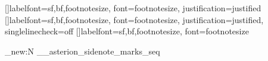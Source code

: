 \newlength{\overhang}
%
\newenvironment{fullwidth}
  {\setlength{\overhang}{\marginparwidth}%
   \addtolength{\overhang}{\marginparsep}%
   \ifthenelse{\boolean{@twoside}}%
     {\begin{adjustwidth*}{}{-\overhang}}%
     {\begin{adjustwidth}{}{-\overhang}}%
  }%
  {\ifthenelse{\boolean{@twoside}}%
    {\end{adjustwidth*}}%
    {\end{adjustwidth}}%
  }


\RequirePackage{fmtcount}
\RequirePackage{ragged2e} %
\newcommand{\marginparstyle}{\footnotesize} %
\long\def\@ympar#1{%
  \@savemarbox\@marbox{\marginparstyle#1}%
  \global\setbox\@currbox\copy\@marbox %
  \@xympar}
\renewcommand*{\marginfont}{\marginparstyle}

\newcommand\newthought[1]{%
   \addvspace{1.0\baselineskip plus 0.5ex minus 0.2ex}%
   \noindent\textsc{#1}%
}%
\ExplSyntaxOn
\NewDocumentCommand {}
{ 
  {
    {
    }
    {
    }
  }
  {
    {
    }
    {
    }
  }
}
\ExplSyntaxOff

\usepackage{caption}
[]{labelfont={sf,bf,footnotesize}, font=footnotesize, justification=justified}
[]{labelfont={sf,bf,footnotesize}, font=footnotesize, justification=justified, singlelinecheck=off}
[]{labelfont={sf,bf,footnotesize}, font=footnotesize}

%

\ifMOBILE
    \raggedbottom %
\else
    \flushbottom
\fi

\ifMOBILE
\ExplSyntaxOn
\seq_new:N \g__asterion_sidenote_marks_seq
\ExplSyntaxOff
\RenewDocumentCommand{\columnbreak}{}{}
\fi

